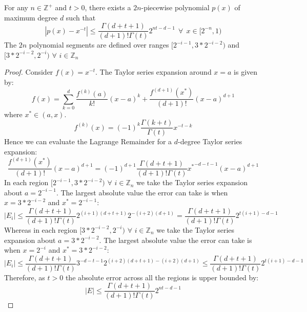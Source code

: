 \begin{lemma}
For any $n \in \mathbb{Z}^+$ and $t > 0$, there exists a $2n$-piecewise polynomial $p(x)$ of maximum degree $d$ such that 
$$|p(x) - x^{-t}| \leq \frac{\Gamma(d+t+1)}{(d+1)!\Gamma(t)}2^{nt-d-1} \>\>\forall\>\> x\in [2^{-n}, 1)$$
The $2n$ polynomial segments are defined over ranges $[2^{-i-1}, 3*2^{-i-2})$ and $[3*2^{-i-2}, 2^{-i})$ $\forall$ $i \in \mathbb{Z}_n$
\label{lemma:inverse_x}
\end{lemma}
\begin{proof}
Consider $f(x) = x^{-t}$. The Taylor series expansion around $x=a$ is given by:
\begin{equation}
    f(x) = \sum_{k=0}^d \frac{f^{(k)}(a)}{k!}(x-a)^k + \frac{f^{(d+1)}(x^*)}{(d+1)!}(x-a)^{d+1}
\end{equation}
where $x^* \in (a,x)$.
\begin{equation}
    f^{(k)}(x) = (-1)^k \frac{\Gamma(k+t)}{\Gamma(t)} x^{-t-k}
\end{equation}
Hence we can evaluate the Lagrange Remainder for a $d$-degree Taylor series expansion:
\begin{equation}
    \frac{f^{(d+1)}(x^*)}{(d+1)!}(x-a)^{d+1} = (-1)^{d+1} \frac{\Gamma(d+t+1)}{(d+1)!\Gamma(t)} {x^*}^{-d-t-1}(x-a)^{d+1}
\end{equation}
In each region $[2^{-i-1}, 3*2^{-i-2})$ $\forall$ $i \in \mathbb{Z}_n$ we take the Taylor series expansion about $a=2^{-i-1}$. The largest absolute value the error can take is when $x = 3*2^{-i-2}$ and $x^* = 2^{-i-1}$:
\begin{equation}
    |E_{i}| \leq \frac{\Gamma(d+t+1)}{(d+1)!\Gamma(t)}2^{(i+1)(d+t+1)}2^{-(i+2)(d+1)} = \frac{\Gamma(d+t+1)}{(d+1)!\Gamma(t)}2^{t(i+1)-d-1}
\end{equation}
Whereas in each region $[3*2^{-i-2}, 2^{-i})$   $\forall$ $i \in \mathbb{Z}_n$ we take the Taylor series expansion about $a=3*2^{-i-2}$. The largest absolute value the error can take is when $x = 2^{-i}$ and $x^* = 3*2^{-i-2}$:
\begin{equation}
    |E_{i}| \leq \frac{\Gamma(d+t+1)}{(d+1)!\Gamma(t)}3^{-d-t-1}2^{(i+2)(d+t+1)-(i+2)(d+1)} \leq \frac{\Gamma(d+t+1)}{(d+1)!\Gamma(t)}2^{t(i+1)-d-1} 
\end{equation}
Therefore, as $t > 0$ the absolute error across all the regions is upper bounded by:
\begin{equation}
    |E| \leq \frac{\Gamma(d+t+1)}{(d+1)!\Gamma(t)}2^{nt-d-1}
\end{equation}
\end{proof}
